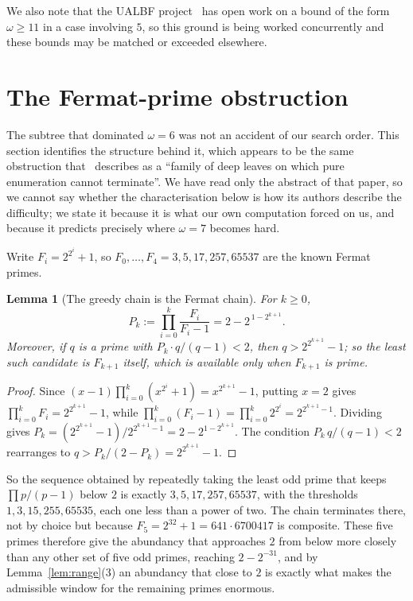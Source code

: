 \documentclass[11pt]{amsart}
\newtheorem{lemma}[theorem]{Lemma}
\theoremstyle{remark}
\begin{document}
We also note that the UALBF project~\cite{ualbf} has open work on a bound of the
form $\omega \ge 11$ in a case involving $5$, so this ground is being worked
concurrently and these bounds may be matched or exceeded elsewhere.

\section{The Fermat-prime obstruction}\label{sec:fermat}

The subtree that dominated $\omega = 6$ was not an accident of our search order.
This section identifies the structure behind it, which appears to be the same
obstruction that~\cite{tty} describes as a ``family of deep leaves on which pure
enumeration cannot terminate''. We have read only the abstract of that paper, so
we cannot say whether the characterisation below is how its authors describe the
difficulty; we state it because it is what our own computation forced on us, and
because it predicts precisely where $\omega = 7$ becomes hard.

Write $F_i = 2^{2^i} + 1$, so $F_0, \dots, F_4 = 3, 5, 17, 257, 65537$ are the
known Fermat primes.

\begin{lemma}[The greedy chain is the Fermat chain]\label{lem:fermat}
For $k \ge 0$,
\[
  P_k := \prod_{i=0}^{k} \frac{F_i}{F_i - 1} = 2 - 2^{\,1 - 2^{k+1}} .
\]
Moreover, if $q$ is a prime with $P_k \cdot q/(q-1) < 2$, then
$q > 2^{2^{k+1}} - 1$; so the least such candidate is $F_{k+1}$ itself, which is
available only when $F_{k+1}$ is prime.
\end{lemma}
\begin{proof}
Since $(x-1)\prod_{i=0}^{k}(x^{2^i}+1) = x^{2^{k+1}} - 1$, putting $x = 2$ gives
$\prod_{i=0}^{k} F_i = 2^{2^{k+1}} - 1$, while
$\prod_{i=0}^{k}(F_i - 1) = \prod_{i=0}^{k} 2^{2^i} = 2^{2^{k+1}-1}$. Dividing
gives $P_k = (2^{2^{k+1}}-1)/2^{2^{k+1}-1} = 2 - 2^{1-2^{k+1}}$. The condition
$P_k\, q/(q-1) < 2$ rearranges to $q > P_k/(2 - P_k) = 2^{2^{k+1}} - 1$.
\end{proof}

So the sequence obtained by repeatedly taking the least odd prime that keeps
$\prod p/(p-1)$ below $2$ is exactly $3, 5, 17, 257, 65537$, with the thresholds
$1, 3, 15, 255, 65535$, each one less than a power of two. The chain terminates
there, not by choice but because $F_5 = 2^{32}+1 = 641 \cdot 6700417$ is
composite. These five primes therefore give the abundancy that approaches $2$
from below more closely than any other set of five odd primes, reaching
$2 - 2^{-31}$, and by Lemma~\ref{lem:range}(3) an abundancy that close to $2$ is
exactly what makes the admissible window for the remaining primes enormous.
\end{document}
